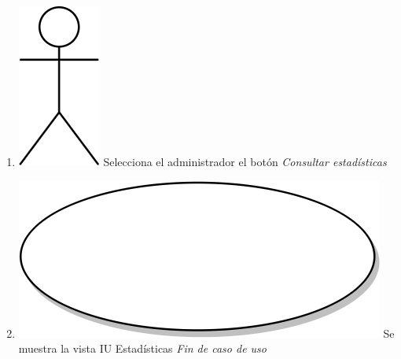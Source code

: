 \begin{enumerate}
  \item {\includegraphics[scale=.1]{Capitulo3/img/actor.png} Selecciona el administrador el botón \textit{Consultar estadísticas}}
  \item {\includegraphics[scale=.05]{Capitulo3/img/proceso.png} Se muestra la vista IU Estadísticas}
  \textit{Fin de caso de uso} \\
\end{enumerate}


